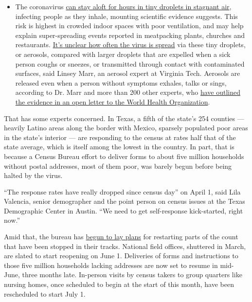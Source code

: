 \begin{itemize}
  \begin{itemize}
  \tightlist
  \item
    The coronavirus
    \href{https://www.nytimes3xbfgragh.onion/2020/07/04/health/239-experts-with-one-big-claim-the-coronavirus-is-airborne.html?action=click\&pgtype=Article\&state=default\&region=MAIN_CONTENT_3\&context=storylines_faq}{can
    stay aloft for hours in tiny droplets in stagnant air}, infecting
    people as they inhale, mounting scientific evidence suggests. This
    risk is highest in crowded indoor spaces with poor ventilation, and
    may help explain super-spreading events reported in meatpacking
    plants, churches and restaurants.
    \href{https://www.nytimes3xbfgragh.onion/2020/07/06/health/coronavirus-airborne-aerosols.html?action=click\&pgtype=Article\&state=default\&region=MAIN_CONTENT_3\&context=storylines_faq}{It's
    unclear how often the virus is spread} via these tiny droplets, or
    aerosols, compared with larger droplets that are expelled when a
    sick person coughs or sneezes, or transmitted through contact with
    contaminated surfaces, said Linsey Marr, an aerosol expert at
    Virginia Tech. Aerosols are released even when a person without
    symptoms exhales, talks or sings, according to Dr. Marr and more
    than 200 other experts, who
    \href{https://academic.oup.com/cid/article/doi/10.1093/cid/ciaa939/5867798}{have
    outlined the evidence in an open letter to the World Health
    Organization}.
  \end{itemize}
\end{itemize}

That has some experts concerned. In Texas, a fifth of the state's 254
counties --- heavily Latino areas along the border with Mexico, sparsely
populated poor areas in the state's interior --- are responding to the
census at rates half that of the state average, which is itself among
the lowest in the country. In part, that is because a Census Bureau
effort to deliver forms to about five million households without postal
addresses, most of them poor, was barely begun before being halted by
the virus.

``The response rates have really dropped since census day'' on April 1,
said Lila Valencia, senior demographer and the point person on census
issues at the Texas Demographic Center in Austin. ``We need to get
self-response kick-started, right now.''

Amid that, the bureau has
\href{https://2020census.gov/content/dam/2020census/materials/news/2020-census\%20operational-adjustments-long\%20version.pdf}{begun
to lay plans} for restarting parts of the count that have been stopped
in their tracks. National field offices, shuttered in March, are slated
to start reopening on June 1. Deliveries of forms and instructions to
those five million households lacking addresses are now set to resume in
mid-June, three months late. In-person visits by census takers to group
quarters like nursing homes, once scheduled to begin at the start of
this month, have been rescheduled to start July 1.

